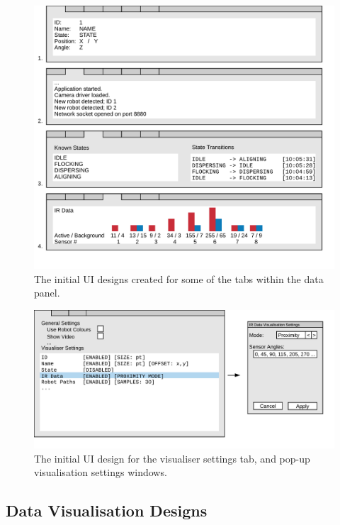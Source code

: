 \begin{figure}
	\centering
	\includegraphics[scale=1]{Figures/DataPanelDesigns.png}
	\decoRule
	\caption[Data Panel Designs]{The initial UI designs created for some of the tabs within the data panel.}
	\label{fig:DataPanelDesigns}
\end{figure}

\begin{figure}
	\centering
	\includegraphics[scale=1]{Figures/VisualiserSettingsTabDesign.png}
	\decoRule
	\caption[Visualiser Settings Tab Design]{The initial UI design for the visualiser settings tab, and pop-up visualisation settings windows.}
	\label{fig:VisualiserSettingsTabDesign}
\end{figure}

\subsection{Data Visualisation Designs}

